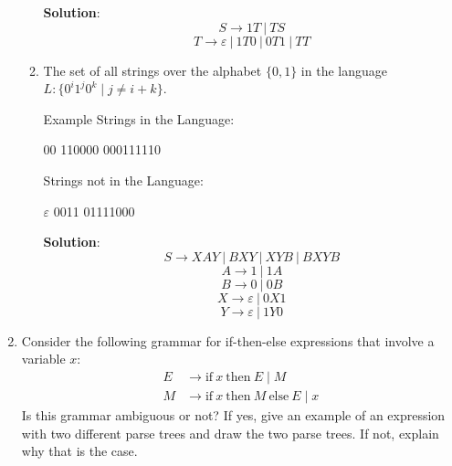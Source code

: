\documentclass[11pt]{article}
\newcommand\tab[1][1cm]{\hspace*{#1}}
\let\epsilon\varepsilon
\begin{document}
\begin{enumerate}
\begin{enumerate}
    \textbf{Solution}:
    $$S\to 1T\ |\ TS$$
    $$T\to \epsilon\ |\ 1T0\ |\ 0T1\ |\ TT$$
    
  \item  The set of all strings over the alphabet $\{0,1\}$ in the language $L:\{0^i 1^j 0^k \mid j \neq i+k\}$.

    Example Strings in the Language: 
    \begin{center}
      00 \tab \tab 110000  \tab \tab 000111110
    \end{center}
    Strings not in the Language: 
    \begin{center}
      $\epsilon$ \tab \tab 0011 \tab\tab 01111000
    \end{center}

    \textbf{Solution}:
    $$S\to XAY\ |\ BXY\ |\ XYB\ |\ BXYB$$
    $$A\to 1\ |\ 1A$$
    $$B\to 0\ |\ 0B$$
    $$X\to \epsilon\ |\ 0X1$$
    $$Y\to \epsilon\ |\ 1Y0$$
  \end{enumerate}

  \newpage

\item Consider the following grammar for if-then-else expressions that involve a variable $x$:
  \begin{align*}
    E &\to \text{if} \ x \ \text{then} \ E \mid \mathit{M} \\
    \mathit{M} &\to \text{if} \ x \ \text{then} \ \mathit{M} \ \text{else} \ E \mid x
  \end{align*}
  Is this grammar ambiguous or not?
  If yes, give an example of an expression with two different parse trees and draw the two parse trees.
  If not, explain why that is the case.


\end{enumerate}
\end{document}
